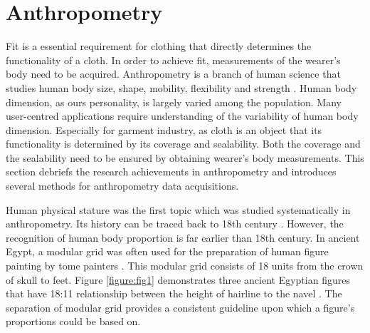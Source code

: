 

\section{Anthropometry}

Fit is a essential requirement for clothing that directly determines the functionality of a cloth. In order to achieve fit, measurements of the wearer's body need to be acquired. Anthropometry is a branch of human science that studies human body size, shape, mobility, flexibility and strength . Human body dimension, as ours personality, is largely varied among the population. Many user-centred applications require understanding of the variability of human body dimension. Especially for garment industry, as cloth is an object that its functionality is determined by its coverage and sealability. Both the coverage and the sealability need to be ensured by obtaining wearer's body measurements. This section debriefs the research achievements in anthropometry and introduces several methods for anthropometry data acquisitions. 

Human physical stature was the first topic which was studied systematically in anthropometry. Its history can be traced back to 18th century . However, the recognition of human body proportion is far earlier than 18th century. In ancient Egypt, a modular grid was often used for the preparation of human figure painting by tome painters . This modular grid consists of 18 units from the crown of skull to feet. Figure \ref{figure:fig1} demonstrates three ancient Egyptian figures that have 18:11 relationship between the height of hairline to the navel . The separation of modular grid provides a consistent guideline upon which a figure's proportions could be based on.

